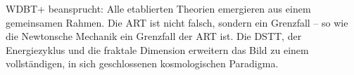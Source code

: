 \documentclass[12pt,a4paper]{article}
\begin{document}
\vspace{0.3cm}
\noindent WDBT+ beansprucht: Alle etablierten Theorien emergieren aus einem gemeinsamen Rahmen. Die ART ist nicht falsch, sondern ein Grenzfall – so wie die Newtonsche Mechanik ein Grenzfall der ART ist. Die DSTT, der Energiezyklus und die fraktale Dimension erweitern das Bild zu einem vollständigen, in sich geschlossenen kosmologischen Paradigma.
\end{document}
